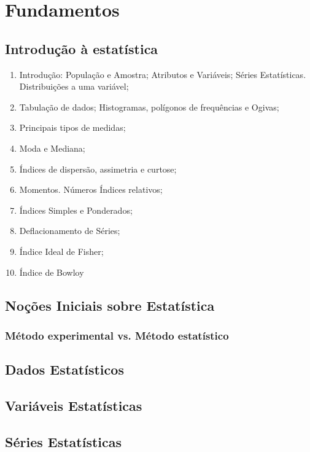\documentclass[a4paper,12pt]{book}
\theoremstyle{definition} %
\theoremstyle{definition}
\begin{document}
\tableofcontents
\newpage
\chapter{Fundamentos}
\section{Introdução à estatística}

\begin{enumerate}[label=\alph*.]
  \item Introdução: População e Amostra; Atributos e Variáveis; Séries Estatísticas. Distribuições a uma variável;
  \item Tabulação de dados; Histogramas, polígonos de frequências e Ogivas;
  \item Principais tipos de medidas;
  \item  Moda e Mediana;
  \item Índices de dispersão, assimetria e curtose;
  \item Momentos. Números Índices relativos;
  \item Índices Simples e Ponderados;
  \item Deflacionamento de Séries;
  \item Índice Ideal de Fisher;
  \item Índice de Bowloy
  \end{enumerate}

     

\section{Noções Iniciais sobre Estatística}
\subsection{Método experimental vs. Método estatístico}

\section{Dados Estatísticos}

\section{Variáveis Estatísticas}

\section{Séries Estatísticas}

\end{document}
